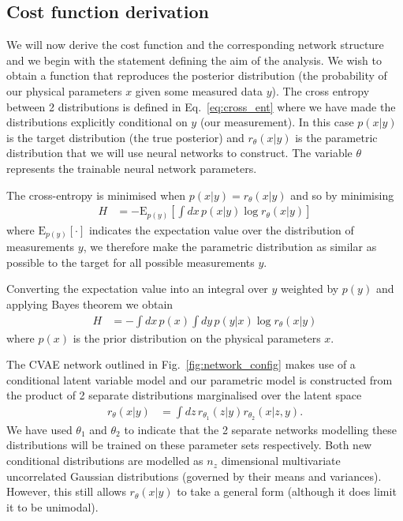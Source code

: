 \documentclass[%
showpacs,
 amsmath,amssymb,
 aps,
 twocolumn,
 prl,
 reprint,
floatfix,
]{revtex4-1}
\begin{document}
\subsection{Cost function derivation}
%
%
We will now derive the cost function and the corresponding network structure
and we begin with the statement defining the aim of the analysis. We wish to
obtain a function that reproduces the posterior distribution (the probability
of our physical parameters $x$ given some measured data $y$). The cross entropy
between 2 distributions is defined in Eq.~\ref{eq:cross_ent} where we have made
the distributions explicitly conditional on $y$ (our measurement). In this case
$p(x|y)$ is the target distribution (the true posterior) and $r_{\theta}(x|y)$
is the parametric distribution that we will use neural networks to construct.
The variable $\theta$ represents the trainable neural network parameters. 

The cross-entropy is minimised when $p(x|y)=r_{\theta}(x|y)$ and so by
minimising
%
\begin{align}\label{eq:cost1}
H &= -\text{E}_{p(y)}\left[\int dx\,p(x|y) \log r_{\theta}(x|y)\right]
\end{align}
% 
where $\text{E}_{p(y)}[\cdot]$ indicates the expectation value over the
distribution of measurements $y$, we therefore make the parametric distribution
as similar as possible to the target for all possible measurements $y$.

Converting the expectation value into an integral over $y$ weighted by $p(y)$
and applying Bayes theorem we obtain
%
\begin{align}\label{eq:cost1}
H &= -\int dx\,p(x)\int dy\,p(y|x)\log r_{\theta}(x|y)
\end{align}
%
where $p(x)$ is the prior distribution on the physical parameters $x$.

The \ac{CVAE} network outlined in Fig.~\ref{fig:network_config} makes use of a
conditional latent variable model and our parametric model is constructed from
the product of 2 separate distributions marginalised over the latent space
%
\begin{align}\label{eq:latent_model}
r_{\theta}(x|y) &= \int dz\,r_{\theta_{1}}(z|y)r_{\theta_{2}}(x|z,y).
\end{align}
%  
We have used $\theta_{1}$ and $\theta_{2}$ to indicate that the 2 separate
networks modelling these distributions will be trained on these parameter sets
respectively. Both new conditional distributions are modelled as $n_{z}$
dimensional multivariate uncorrelated Gaussian distributions (governed by their
means and variances). However, this still allows $r_{\theta}(x|y)$ to take a
general form (although it does limit it to be unimodal).  
\end{document}
